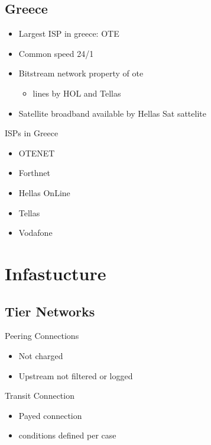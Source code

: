 \documentclass[arial,pdftex]{beamer}
\begin{document}
\subsection{Greece}
\begin{frame}
  \begin{itemize}
  \item Largest ISP in greece: OTE
  \item Common speed 24/1
  \item Bitstream network property of ote
    \begin{itemize}
    \item lines by HOL and Tellas
    \end{itemize}
  \item Satellite broadband available by Hellas Sat sattelite
  \end{itemize}
\end{frame}

\begin{frame}{ISPs in Greece}
  \begin{itemize}
  \item OTENET
  \item Forthnet
  \item Hellas OnLine
  \item Tellas
  \item Vodafone
  \end{itemize}
\end{frame}
\section{Infastucture}

\subsection{Tier Networks}
\begin{frame}{Peering Connections}
  \begin{itemize}
  \item Not charged
  \item Upstream not filtered or logged
  \end{itemize}
\end{frame}

\begin{frame}{Transit Connection}
  \begin{itemize}
  \item Payed connection
  \item conditions defined per case
  \end{itemize}
\end{frame}
\end{document}
